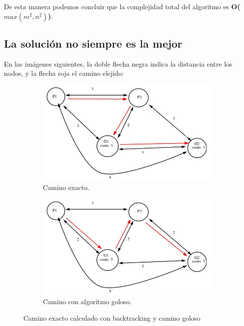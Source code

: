 \par De esta manera podemos concluir que la complejidad total del algoritmo es \textbf{O($max(m^2, n^2)$)}.

\subsection{La solución no siempre es la mejor}
	En las imágenes siguientes, la doble flecha negra indica la distancia entre los nodos, y la flecha roja el camino elejido:
\begin{figure}[H]
    \begin{subfigure}[b]{0.49\textwidth}
        \includegraphics[width=\linewidth]{img/ejercicio2/exacto.jpg}
        \caption{Camino exacto.}
        \label{fig: ejercicio1_ejemplo_camino1_2}
    \end{subfigure}
    \begin{subfigure}[b]{0.49\textwidth}
        \includegraphics[width=\linewidth]{img/ejercicio2/goloso_malo.jpg}
        \caption{Camino con algoritmo goloso.}
        \label{fig: ejercicio1_ejemplo_camino1_4}
    \end{subfigure}
    \caption{Camino exacto calculado con backtracking y camino goloso}
    \label{fig: ejercicio1_ejemplo_caminos1}
\end{figure}

